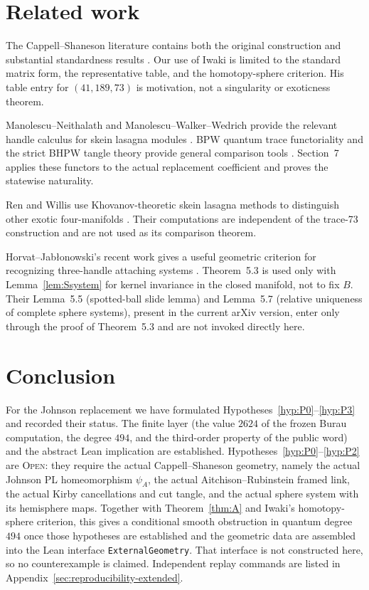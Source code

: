 \documentclass[11pt]{amsart}
\theoremstyle{definition}
\theoremstyle{remark}
\newcommand{\Open}{\textnormal{\textsc{Open}}}
\begin{document}


\section{Related work}

The Cappell--Shaneson literature contains both the original construction
\cite{CappellShaneson1976,AitchisonRubinstein1984} and substantial
standardness results
\cite{Akbulut2010,Gompf2010,KimYamada2017,Iwaki2024}.  Our use of Iwaki is
limited to the standard matrix form, the representative table, and the
homotopy-sphere criterion.  His table entry for $(41,189,73)$ is motivation,
not a singularity or exoticness theorem.

Manolescu--Neithalath and Manolescu--Walker--Wedrich provide the relevant
handle calculus for skein lasagna modules
\cite{ManolescuNeithalath2020,ManolescuWalkerWedrich2023}.  BPW quantum trace
functoriality and the strict BHPW tangle theory provide general comparison
tools \cite{BeliakovaPutyraWehrli2019,
BeliakovaHogancampPutyraWehrli2023}.  Section~7 applies these functors to the
actual replacement coefficient and proves the statewise naturality.

Ren and Willis use Khovanov-theoretic skein lasagna methods to distinguish
other exotic four-manifolds \cite{RenWillis2024}.  Their computations are
independent of the trace-73 construction and are not used as its comparison
theorem.

Horvat--Jab\l{}onowski's recent work gives a useful geometric criterion for
recognizing three-handle attaching systems \cite{HorvatJablonowski2025}.
Theorem~5.3 is used only with Lemma~\ref{lem:Ssystem} for kernel invariance
in the closed manifold, not to fix $B$.  Their Lemma~5.5 (spotted-ball slide
lemma) and Lemma~5.7 (relative uniqueness of complete sphere systems),
present in the current arXiv version, enter only through the proof of
Theorem~5.3 and are not invoked directly here.

\section{Conclusion}

For the Johnson replacement we have formulated
Hypotheses~\ref{hyp:P0}--\ref{hyp:P3} and recorded their status.  The
finite layer (the value $2624$ of the frozen Burau computation, the degree
$494$, and the third-order property of the public word) and the abstract
Lean implication are established.  Hypotheses~\ref{hyp:P0}--\ref{hyp:P2}
are \Open: they require the actual Cappell--Shaneson geometry, namely the
actual Johnson PL homeomorphism $\psi_A$, the actual Aitchison--Rubinstein
framed link, the actual Kirby cancellations and cut tangle, and the actual
sphere system with its hemisphere maps.  Together with Theorem~\ref{thm:A}
and Iwaki's homotopy-sphere criterion, this gives a conditional smooth
obstruction in quantum degree $494$ once those hypotheses are established
and the geometric data are assembled into the Lean interface
\texttt{ExternalGeometry}.  That interface is not constructed here, so no
counterexample is claimed.  Independent replay commands are listed in
Appendix~\ref{sec:reproducibility-extended}.
\end{document}
